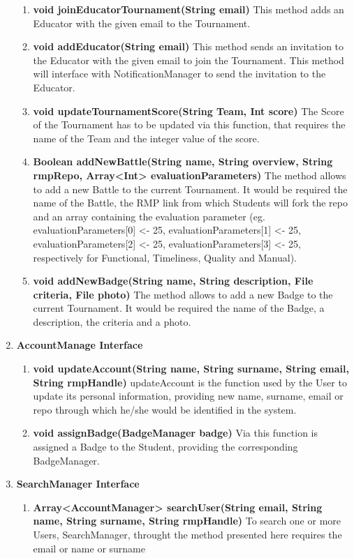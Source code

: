 \begin{enumerate}
\begin{enumerate}[label=$\bullet$]
        \item \textbf{void joinEducatorTournament(String email)} This method adds an Educator with the given email to the Tournament.
        \item \textbf{void addEducator(String email)} This method sends an invitation to the Educator with the given email to join the Tournament. This method will interface with NotificationManager to send the invitation to the Educator.
        \item \textbf{void updateTournamentScore(String Team, Int score)} The Score of the Tournament has to be updated via this function, that requires the name of the Team and the integer value of the score.
        \item \textbf{Boolean addNewBattle(String name, String overview, String rmpRepo, Array<Int> evaluationParameters)} The method allows to add a new Battle to the current Tournament. It would be required the name of the Battle, 
        the RMP link from which Students will fork the repo and an array containing the evaluation parameter (eg. evaluationParameters[0] <- 25, evaluationParameters[1] <- 25, evaluationParameters[2] <- 25, evaluationParameters[3] <- 25,
        respectively for Functional, Timeliness, Quality and Manual).
        \item \textbf{void addNewBadge(String name, String description, File criteria, File photo)} The method allows to add a new Badge to the current Tournament. It would be required the name of the Badge, a description, the criteria 
        and a photo.
        \end{enumerate}
    \item \textbf{AccountManage Interface} 
        \begin{enumerate}[label=$\bullet$]
            \item \textbf{void updateAccount(String name, String surname, String email, String rmpHandle)} updateAccount is the function used by the User to update its personal information, providing new name, surname, email or repo 
            through which he/she would be identified in the system.
            \item \textbf{void assignBadge(BadgeManager badge)} Via this function is assigned a Badge to the Student, providing the corresponding BadgeManager.
        \end{enumerate}
    \item \textbf{SearchManager Interface} 
        \begin{enumerate}[label=$\bullet$]
            \item \textbf{Array<AccountManager> searchUser(String email, String name, String surname, String rmpHandle)} To search one or more Users, SearchManager, throught the method presented here requires the email or name or surname

\end{enumerate}
\end{enumerate}
